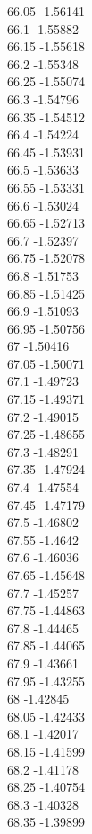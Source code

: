 {66.05	-1.56141\\
66.1	-1.55882\\
66.15	-1.55618\\
66.2	-1.55348\\
66.25	-1.55074\\
66.3	-1.54796\\
66.35	-1.54512\\
66.4	-1.54224\\
66.45	-1.53931\\
66.5	-1.53633\\
66.55	-1.53331\\
66.6	-1.53024\\
66.65	-1.52713\\
66.7	-1.52397\\
66.75	-1.52078\\
66.8	-1.51753\\
66.85	-1.51425\\
66.9	-1.51093\\
66.95	-1.50756\\
67	-1.50416\\
67.05	-1.50071\\
67.1	-1.49723\\
67.15	-1.49371\\
67.2	-1.49015\\
67.25	-1.48655\\
67.3	-1.48291\\
67.35	-1.47924\\
67.4	-1.47554\\
67.45	-1.47179\\
67.5	-1.46802\\
67.55	-1.4642\\
67.6	-1.46036\\
67.65	-1.45648\\
67.7	-1.45257\\
67.75	-1.44863\\
67.8	-1.44465\\
67.85	-1.44065\\
67.9	-1.43661\\
67.95	-1.43255\\
68	-1.42845\\
68.05	-1.42433\\
68.1	-1.42017\\
68.15	-1.41599\\
68.2	-1.41178\\
68.25	-1.40754\\
68.3	-1.40328\\
68.35	-1.39899\\
}
